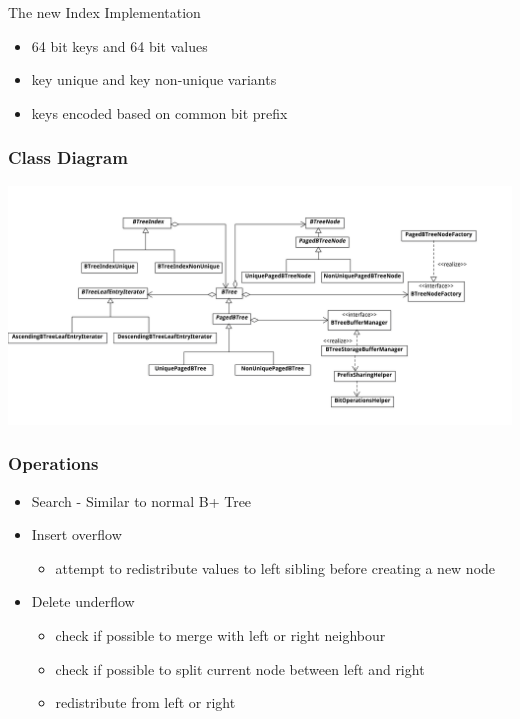 \documentclass{beamer}
\begin{document}
\begin{section}{The new Index Implementation}
\begin{frame}
\begin{itemize}
        \item 64 bit keys and 64 bit values
        \item key unique and key non-unique variants
        \item keys encoded based on common bit prefix
      \end{itemize}
    \end{frame}
    \begin{frame}
        \frametitle{Class Diagram}
        \includegraphics[scale=0.07]{ZooDBClassDiagram} 
    \end{frame}
    \begin{frame}
        \frametitle{Operations}
        \begin{itemize}
        \item Search - Similar to normal B+ Tree
        \item Insert overflow
            \begin{itemize}
            \item attempt to redistribute values to left sibling before creating a new node
            \end{itemize}
        \item Delete underflow
            \begin{itemize}
            \item check if possible to merge with left or right neighbour
            \item check if possible to split current node between left and right
            \item redistribute from left or right
            \end{itemize}
        \end{itemize}
    \end{frame}
  \end{section}
\end{document}
